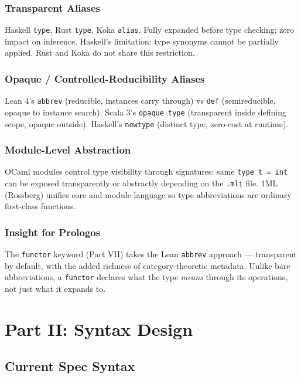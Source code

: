 \documentclass[11pt]{article}
\begin{document}
\subsubsection{Transparent Aliases}
\label{sec:org2d0c29d}

Haskell \texttt{type}, Rust \texttt{type}, Koka \texttt{alias}. Fully expanded before type checking;
zero impact on inference. Haskell's limitation: type synonyms cannot be partially
applied. Rust and Koka do not share this restriction.
\subsubsection{Opaque / Controlled-Reducibility Aliases}
\label{sec:org68ad41c}

Lean 4's \texttt{abbrev} (reducible, instances carry through) vs \texttt{def} (semireducible,
opaque to instance search). Scala 3's \texttt{opaque type} (transparent inside defining
scope, opaque outside). Haskell's \texttt{newtype} (distinct type, zero-cost at runtime).
\subsubsection{Module-Level Abstraction}
\label{sec:orgf845975}

OCaml modules control type visibility through signatures: same \texttt{type t = int}
can be exposed transparently or abstractly depending on the \texttt{.mli} file. 1ML
(Rossberg) unifies core and module language so type abbreviations are ordinary
first-class functions.
\subsubsection{Insight for Prologos}
\label{sec:org1f5afa5}

The \texttt{functor} keyword (Part VII) takes the Lean \texttt{abbrev} approach --- transparent
by default, with the added richness of category-theoretic metadata. Unlike bare
abbreviations, a \texttt{functor} declares what the type \emph{means} through its operations,
not just what it expands to.
\section{Part II: Syntax Design}
\label{sec:orga409653}

\subsection{Current Spec Syntax}
\label{sec:orgf7c6e8f}
\end{document}
